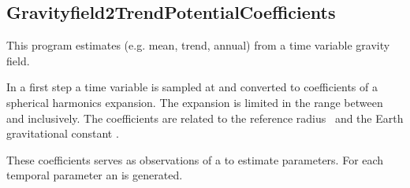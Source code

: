 \clearpage
\subsection{Gravityfield2TrendPotentialCoefficients}\label{Gravityfield2TrendPotentialCoefficients}
This program estimates 
(e.g. mean, trend, annual) from a time variable gravity field.

In a first step a time variable 
is sampled at 
and converted to coefficients of a spherical harmonics expansion.
The expansion is limited in the range between 
and  inclusively.
The coefficients are related to the reference radius~
and the Earth gravitational constant .

These coefficients serves as observations of
a  to estimate
 parameters.
For each temporal parameter an
is generated.



